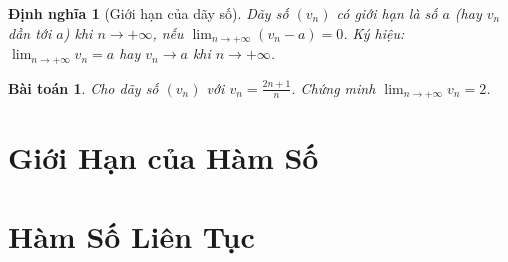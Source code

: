 \documentclass{article}
\numberwithin{equation}{section}
\newtheorem{baitoan}{Bài toán}
\newtheorem{dinhnghia}{Định nghĩa}[section]
\begin{document}
\begin{dinhnghia}[Giới hạn của dãy số]
	Dãy số $(v_n)$ có giới hạn là số $a$ (hay $v_n$ dần tới $a$) khi $n\to+\infty$, nếu $\lim_{n\to+\infty} (v_n - a) = 0$. Ký hiệu: $\lim_{n\to+\infty} v_n = a$ hay $v_n\to a$ khi $n\to+\infty$.
\end{dinhnghia}

\begin{baitoan}
	Cho dãy số $(v_n)$ với $v_n = \frac{2n + 1}{n}$. Chứng minh $\lim_{n\to+\infty} v_n = 2$.
\end{baitoan}


\section{Giới Hạn của Hàm Số}


\section{Hàm Số Liên Tục}


\printbibliography[heading=bibintoc]
	
\end{document}
